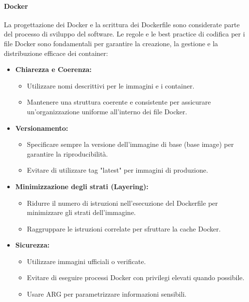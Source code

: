 \paragraph{Docker}

La progettazione dei Docker e la scrittura dei Dockerfile sono considerate parte del processo di sviluppo del software.
Le regole e le best practice di codifica per i file Docker sono fondamentali per garantire la creazione, la gestione e la distribuzione efficace dei container:
\begin{itemize}
    \item \textbf{Chiarezza e Coerenza:}
    \begin{itemize}
        \item Utilizzare nomi descrittivi per le immagini e i container.
        \item Mantenere una struttura coerente e consistente per assicurare un'organizzazione uniforme all'interno dei file Docker.
    \end{itemize}

\item \textbf{Versionamento:}
    \begin{itemize}
        \item Specificare sempre la versione dell'immagine di base (base image) per garantire la riproducibilità.
        \item Evitare di utilizzare tag "latest" per immagini di produzione.
    \end{itemize}

\item \textbf{Minimizzazione degli strati (Layering):}
    \begin{itemize}
        \item Ridurre il numero di istruzioni nell'esecuzione del Dockerfile per minimizzare gli strati dell'immagine.
        \item Raggruppare le istruzioni correlate per sfruttare la cache Docker.
    \end{itemize}

\item \textbf{Sicurezza:}
    \begin{itemize}
        \item Utilizzare immagini ufficiali o verificate.
        \item Evitare di eseguire processi Docker con privilegi elevati quando possibile.
        \item Usare ARG per parametrizzare informazioni sensibili.
    \end{itemize}


\end{itemize}
